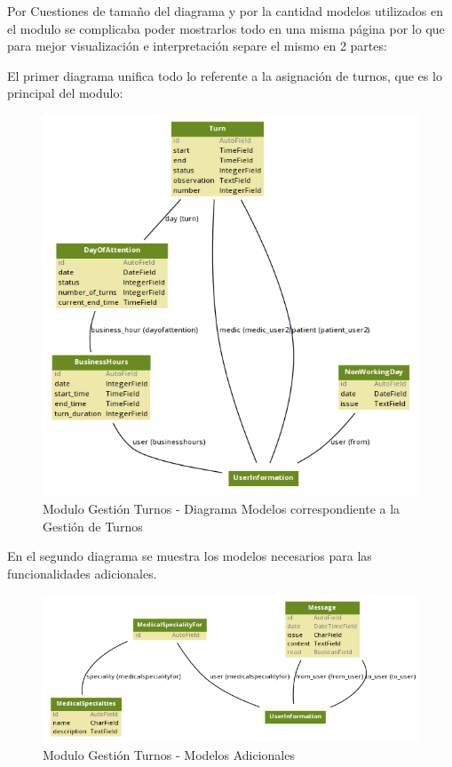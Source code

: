 Por Cuestiones de tamaño del diagrama y por la cantidad modelos utilizados en el modulo se complicaba poder mostrarlos todo en una misma página por lo que para mejor visualización e interpretación separe el mismo en 2 partes:

El primer diagrama unifica todo lo referente a la asignación de turnos, que es lo principal del modulo:

\begin{figure}[H]
    \centering
    \includegraphics[scale=0.6]{resourse/gt-gt.png}
    \caption{Modulo Gestión Turnos - Diagrama Modelos correspondiente a la Gestión de Turnos}
    \label{fig:124}
\end{figure}  

En el segundo diagrama se muestra los modelos necesarios para las funcionalidades adicionales.

\begin{figure}[H]
    \centering
    \includegraphics[scale=0.6]{resourse/gt-ot.png}
    \caption{Modulo Gestión Turnos - Modelos Adicionales}
    \label{fig:125}
\end{figure}  


